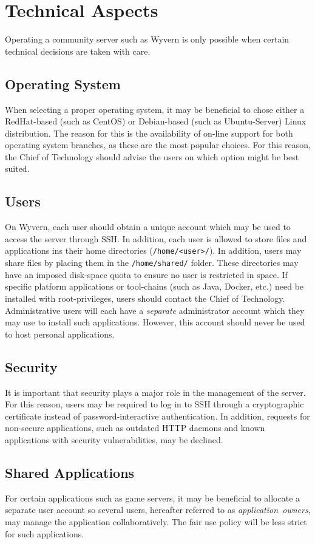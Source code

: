 \section{Technical Aspects}
\label{sec:technical}
Operating a community server such as Wyvern is only possible when certain technical decisions are taken with care.

\subsection{Operating System}
When selecting a proper operating system, it may be beneficial to chose either a RedHat-based (such as CentOS) or Debian-based (such as Ubuntu-Server) Linux distribution. The reason for this is the availability of on-line support for both operating system branches, as these are the most popular choices. For this reason, the Chief of Technology should advise the users on which option might be best suited.

\subsection{Users}
On Wyvern, each user should obtain a unique account which may be used to access the server through SSH. In addition, each user is allowed to store files and applications ins their home directories (\texttt{/home/<user>/}). In addition, users may share files by placing them in the \texttt{/home/shared/} folder. These directories may have an imposed disk-space quota to ensure no user is restricted in space. If specific platform applications or tool-chains (such as Java, Docker, etc.) need be installed with root-privileges, users should contact the Chief of Technology. Administrative users will each have a \textit{separate} administrator account which they may use to install such applications. However, this account should never be used to host personal applications.

\subsection{Security}
It is important that security plays a major role in the management of the server. For this reason, users may be required to log in to SSH through a cryptographic certificate instead of password-interactive authentication. In addition, requests for non-secure applications, such as outdated HTTP daemons and known applications with security vulnerabilities, may be declined.

\subsection{Shared Applications}
For certain applications such as game servers, it may be beneficial to allocate a separate user account so several users, hereafter referred to as \textit{application~owners}, may manage the application collaboratively. The fair use policy will be less strict for such applications.
